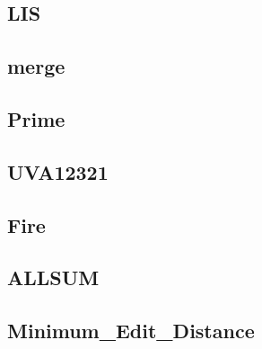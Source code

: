     \subsection{LIS}
        
    \subsection{merge}
          
    \subsection{Prime}
        
    \subsection{UVA12321}
        
    \subsection{Fire}
        
    \subsection{ALLSUM}
        
    \subsection{Minimum_Edit_Distance}
        
        
